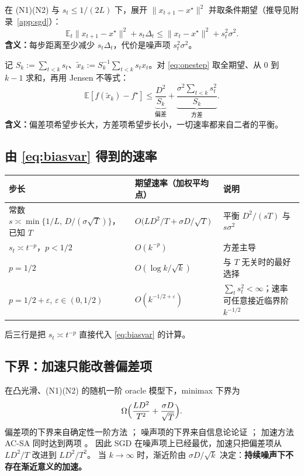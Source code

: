 \documentclass[11pt]{ctexart}
\newcommand{\E}{\mathbb{E}}
\begin{document}
在 (N1)(N2) 与 $s_t\le 1/(2L)$ 下，展开 $\|x_{t+1}-x^\star\|^2$ 并取条件期望（推导见附录~\ref{app:sgd}）：
\begin{equation}
\E_t\|x_{t+1}-x^\star\|^2+s_t\Delta_t\le\|x_t-x^\star\|^2+s_t^2\sigma^2 .
\label{eq:onestep}
\end{equation}
\textbf{含义：}每步距离至少减少 $s_t\Delta_t$，代价是噪声项 $s_t^2\sigma^2$。

记 $S_k:=\sum_{t<k}s_t$、$\widetilde x_k:=S_k^{-1}\sum_{t<k}s_tx_t$。对 \eqref{eq:onestep} 取全期望、从 $0$ 到 $k-1$ 求和，再用 Jensen 不等式：
\begin{equation}
\boxed{\;
\E[f(\widetilde x_k)-f^\star]
\le
\underbrace{\frac{D^2}{S_k}}_{\text{偏差}}
+\underbrace{\frac{\sigma^2\sum_{t<k}s_t^2}{S_k}}_{\text{方差}} .
\;}
\label{eq:biasvar}
\end{equation}
\textbf{含义：}偏差项希望步长大，方差项希望步长小，一切速率都来自二者的平衡。

\subsection{由 \eqref{eq:biasvar} 得到的速率}

\begin{center}
\small
\begin{tabularx}{\linewidth}{@{}Yl Y@{}}
\toprule
步长 & 期望速率（加权平均点） & 说明 \\
\midrule
常数 $s\asymp\min\{1/L,\,D/(\sigma\sqrt T)\}$，已知 $T$ & $O\bigl(LD^2/T+\sigma D/\sqrt T\bigr)$ & 平衡 $D^2/(sT)$ 与 $s\sigma^2$ \citep{nemirovski2009} \\
$s_t\asymp t^{-p}$，$p<1/2$ & $O(k^{-p})$ & 方差主导 \\
$p=1/2$ & $O(\log k/\sqrt k)$ & 与 $T$ 无关时的最好选择 \\
$p=1/2+\varepsilon$, $\varepsilon\in(0,1/2)$ & $O(k^{-1/2+\varepsilon})$ & $\sum_t s_t^2<\infty$；速率可任意接近临界阶 $k^{-1/2}$ \\
\bottomrule
\end{tabularx}
\end{center}
后三行是把 $s_t\asymp t^{-p}$ 直接代入 \eqref{eq:biasvar} 的计算。

\subsection{下界：加速只能改善偏差项}

在凸光滑、(N1)(N2) 的随机一阶 oracle 模型下，minimax 下界为
\[
\Omega\Bigl(\frac{LD^2}{T^2}+\frac{\sigma D}{\sqrt T}\Bigr).
\]
偏差项的下界来自确定性一阶方法 \citep[Theorem~2.1.7]{nesterov2004}；
噪声项的下界来自信息论论证 \citep{nemirovski1983,agarwal2012}；
加速方法 AC-SA 同时达到两项 \citep{lan2012}。
因此 SGD 在噪声项上已经最优，加速只把偏差项从 $LD^2/T$ 改进到 $LD^2/T^2$。
当 $k\to\infty$ 时，渐近阶由 $\sigma D/\sqrt k$ 决定：\textbf{持续噪声下不存在渐近意义的加速。}
\end{document}
